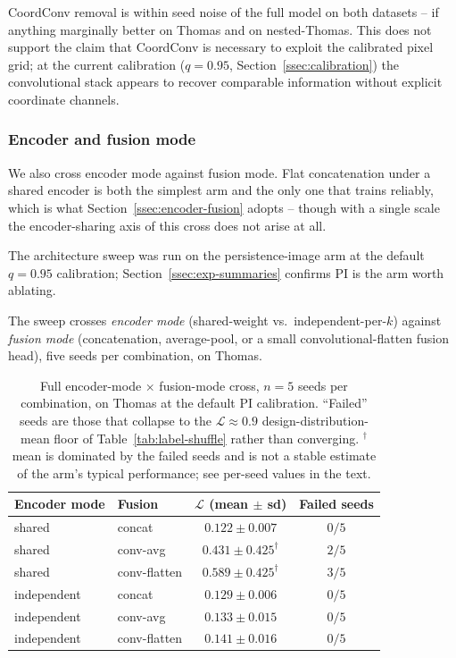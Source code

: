 \documentclass[11pt,letterpaper]{article}
\newcommand{\1}{\mathds{1}}
\theoremstyle{plain}
\theoremstyle{definitioncolon}
\begin{document}
CoordConv removal is within seed noise of the full model on both datasets --
if anything marginally better on Thomas and on nested-Thomas. This does not
support the claim that CoordConv is necessary to exploit the calibrated pixel
grid; at the current calibration ($q=0.95$, Section~\ref{ssec:calibration})
the convolutional stack appears to recover comparable information without
explicit coordinate channels.

\subsubsection{Encoder and fusion mode}
\label{ssec:exp-ablations}

We also cross encoder mode against fusion mode. Flat concatenation under a
shared encoder is both the simplest arm and the only one that trains reliably,
which is what Section~\ref{ssec:encoder-fusion} adopts -- though with a single
scale the encoder-sharing axis of this cross does not arise at all.

The architecture sweep was run on the persistence-image arm at the default $q=0.95$
calibration; Section~\ref{ssec:exp-summaries} confirms PI is the arm worth
ablating.

The sweep crosses \emph{encoder mode} (shared-weight vs.\
independent-per-$k$) against \emph{fusion mode} (concatenation, average-pool,
or a small convolutional-flatten fusion head), five seeds per combination, on
Thomas.

\begin{table}[tbp]
\centering
\small
\begin{tabular}{llcc}
\toprule
Encoder mode & Fusion & $\mathcal{L}$ (mean $\pm$ sd) & Failed seeds \\
\midrule
shared      & concat        & $0.122 \pm 0.007$ & $0/5$ \\
shared      & conv-avg      & $0.431 \pm 0.425^\dagger$ & $2/5$ \\
shared      & conv-flatten  & $0.589 \pm 0.425^\dagger$ & $3/5$ \\
independent & concat        & $0.129 \pm 0.006$ & $0/5$ \\
independent & conv-avg      & $0.133 \pm 0.015$ & $0/5$ \\
independent & conv-flatten  & $0.141 \pm 0.016$ & $0/5$ \\
\bottomrule
\end{tabular}
\caption{Full encoder-mode $\times$ fusion-mode cross, $n=5$ seeds per
combination, on Thomas at the default PI calibration. ``Failed'' seeds are
those that collapse to the $\mathcal{L}\approx0.9$ design-distribution-mean
floor of Table~\ref{tab:label-shuffle} rather than converging.
$^\dagger$ mean is dominated by the failed seeds and is not a stable estimate
of the arm's typical performance; see per-seed values in the text.}
\label{tab:encoder-fusion-sweep}
\end{table}
\end{document}
